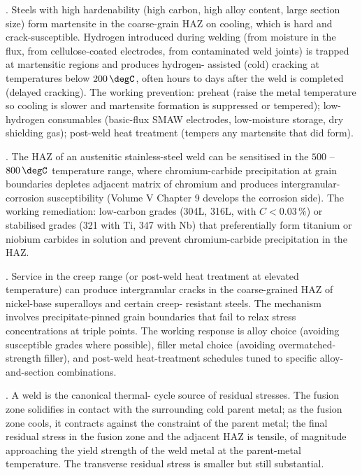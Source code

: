 . Steels with high
hardenability (high carbon, high alloy content, large section size)
form martensite in the coarse-grain HAZ on cooling, which is hard and
crack-susceptible. Hydrogen introduced during welding (from moisture
in the flux, from cellulose-coated electrodes, from contaminated weld
joints) is trapped at martensitic regions and produces hydrogen-
assisted (cold) cracking at temperatures below $200\,\degC$, often
hours to days after the weld is completed (delayed cracking). The
working prevention: preheat (raise the metal temperature so cooling
is slower and martensite formation is suppressed or tempered);
low-hydrogen consumables (basic-flux SMAW electrodes, low-moisture
storage, dry shielding gas); post-weld heat treatment (tempers any
martensite that did form).

. The HAZ of an
austenitic stainless-steel weld can be sensitised in the $500$ -- $800\,
\degC$ temperature range, where chromium-carbide precipitation at
grain boundaries depletes adjacent matrix of chromium and produces
intergranular-corrosion susceptibility (Volume V Chapter 9 develops
the corrosion side). The working remediation: low-carbon grades
(304L, 316L, with $C < 0.03\,\%$) or stabilised grades (321 with Ti,
347 with Nb) that preferentially form titanium or niobium carbides
in solution and prevent chromium-carbide precipitation in the HAZ.

. Service in the creep range (or post-weld heat treatment at
elevated temperature) can produce intergranular cracks in the
coarse-grained HAZ of nickel-base superalloys and certain creep-
resistant steels. The mechanism involves precipitate-pinned grain
boundaries that fail to relax stress concentrations at triple points.
The working response is alloy choice (avoiding susceptible grades
where possible), filler metal choice (avoiding overmatched-strength
filler), and post-weld heat-treatment schedules tuned to specific
alloy-and-section combinations.

. A weld is the canonical thermal-
cycle source of residual stresses. The fusion zone solidifies in
contact with the surrounding cold parent metal; as the fusion zone
cools, it contracts against the constraint of the parent metal; the
final residual stress in the fusion zone and the adjacent HAZ is
tensile, of magnitude approaching the yield strength of the weld
metal at the parent-metal temperature. The transverse residual stress
is smaller but still substantial.

